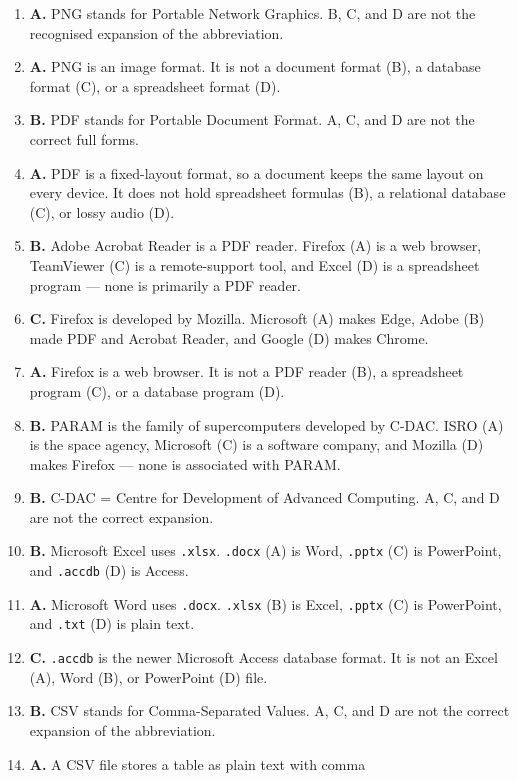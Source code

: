 \begin{enumerate}[label=\textbf{Q\arabic*.}, leftmargin=*]
\item \textbf{A.} PNG stands for Portable Network Graphics. B, C, and D are
  not the recognised expansion of the abbreviation.
\item \textbf{A.} PNG is an image format. It is not a document format (B), a
  database format (C), or a spreadsheet format (D).
\item \textbf{B.} PDF stands for Portable Document Format. A, C, and D are
  not the correct full forms.
\item \textbf{A.} PDF is a fixed-layout format, so a document keeps the same
  layout on every device. It does not hold spreadsheet formulas (B), a
  relational database (C), or lossy audio (D).
\item \textbf{B.} Adobe Acrobat Reader is a PDF reader. Firefox (A) is a web
  browser, TeamViewer (C) is a remote-support tool, and Excel (D) is a
  spreadsheet program --- none is primarily a PDF reader.
\item \textbf{C.} Firefox is developed by Mozilla. Microsoft (A) makes Edge,
  Adobe (B) made PDF and Acrobat Reader, and Google (D) makes Chrome.
\item \textbf{A.} Firefox is a web browser. It is not a PDF reader (B), a
  spreadsheet program (C), or a database program (D).
\item \textbf{B.} PARAM is the family of supercomputers developed by C-DAC.
  ISRO (A) is the space agency, Microsoft (C) is a software company, and
  Mozilla (D) makes Firefox --- none is associated with PARAM.
\item \textbf{B.} C-DAC = Centre for Development of Advanced Computing. A, C,
  and D are not the correct expansion.
\item \textbf{B.} Microsoft Excel uses \texttt{.xlsx}. \texttt{.docx} (A) is
  Word, \texttt{.pptx} (C) is PowerPoint, and \texttt{.accdb} (D) is Access.
\item \textbf{A.} Microsoft Word uses \texttt{.docx}. \texttt{.xlsx} (B) is
  Excel, \texttt{.pptx} (C) is PowerPoint, and \texttt{.txt} (D) is plain
  text.
\item \textbf{C.} \texttt{.accdb} is the newer Microsoft Access database
  format. It is not an Excel (A), Word (B), or PowerPoint (D) file.
\item \textbf{B.} CSV stands for Comma-Separated Values. A, C, and D are not
  the correct expansion of the abbreviation.
\item \textbf{A.} A CSV file stores a table as plain text with comma

\end{enumerate}
